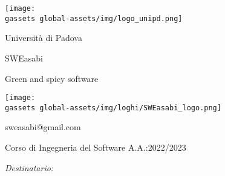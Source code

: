 \documentclass{article}
\begin{document}
\begin{center}
    \begin{minipage}{0.49\linewidth}
        \begin{flushleft}

        \begin{minipage}{0.5\linewidth}
        \begin{center}
        \texttt{[image: \\gassets global-assets/img/logo\_unipd.png]}
        
        \normalsize Università di Padova
        
        \end{center}
        \end{minipage}
        \end{flushleft}
    \end{minipage}
    \begin{minipage}{0.49\linewidth}
        \begin{flushright}

        \begin{minipage}{0.5\linewidth}
        \begin{center}

        \Large SWEasabi

        \tiny Green and spicy software

        \texttt{[image: \\gassets global-assets/img/loghi/SWEasabi\_logo.png]}
        
        \small sweasabi@gmail.com

        \end{center}
        \end{minipage}
        \end{flushright}
    \end{minipage}

    \vspace{1cm}

    Corso di Ingegneria del Software A.A.:2022/2023
    
    \vspace{2cm}

    \begin{minipage}[t]{0.49\linewidth}
        \begin{flushleft}

        \begin{minipage}[t]{0.8\linewidth}
        \begin{flushleft}
        
            \normalsize
            \textit{Destinatario:}
            \vspace{0.5cm}


\end{flushleft}
\end{minipage}
\end{flushleft}
\end{minipage}
\end{center}
\end{document}
